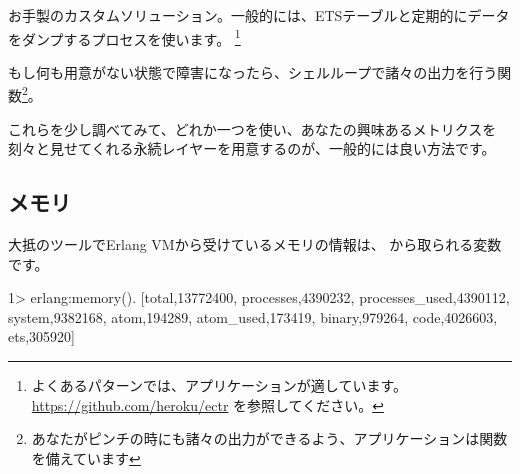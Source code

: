 \begin{itemize*}
	\item お手製のカスタムソリューション。一般的には、ETSテーブルと定期的にデータをダンプするプロセスを使います。
    \footnote{よくあるパターンでは、アプリケーションが適しています。 \href{https://github.com/heroku/ectr}{https://github.com/heroku/ectr} を参照してください。}
	\item もし何も用意がない状態で障害になったら、シェルループで諸々の出力を行う関数\footnote{あなたがピンチの時にも諸々の出力ができるよう、アプリケーションは関数 を備えています}。
\end{itemize*}

これらを少し調べてみて、どれか一つを使い、あなたの興味あるメトリクスを刻々と見せてくれる永続レイヤーを用意するのが、一般的には良い方法です。

\subsection{メモリ}

大抵のツールでErlang VMから受けているメモリの情報は、 から取られる変数です。

\begin{VerbatimEshell}
1> erlang:memory().
[{total,13772400},
 {processes,4390232},
 {processes_used,4390112},
 {system,9382168},
 {atom,194289},
 {atom_used,173419},
 {binary,979264},
 {code,4026603},
 {ets,305920}]
\end{VerbatimEshell}

